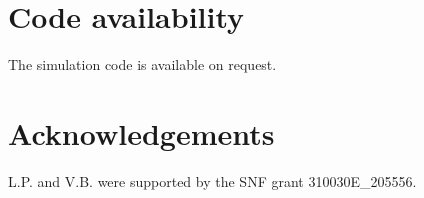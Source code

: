 \section{Code availability}
The simulation code is available on request.

\section{Acknowledgements}
L.P. and V.B. were supported by the SNF grant 310030E\_205556.


